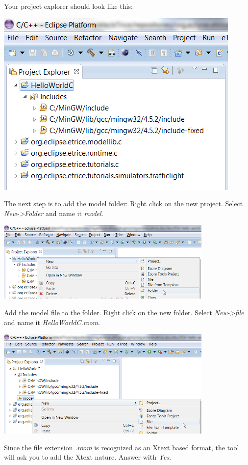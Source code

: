 Your project explorer should look like this:

\includegraphics{images/016-HelloWorldC01.png}

The next step is to add the model folder:
Right click on the new project. Select \textit{New->Folder} and name it \textit{model}.

\includegraphics[width=0.8\textwidth]{images/016-HelloWorldC02.png}

Add the model file to the folder. Right click on the new folder. Select \textit{New->file} and name it 
\textit{HelloWorldC.room}.

\includegraphics[width=0.8\textwidth]{images/016-HelloWorldC03.png}

Since the file extension \textit{.room} is recognized as an Xtext based format, the tool will ask you to add the Xtext nature. Answer with \textit{Yes}. 

